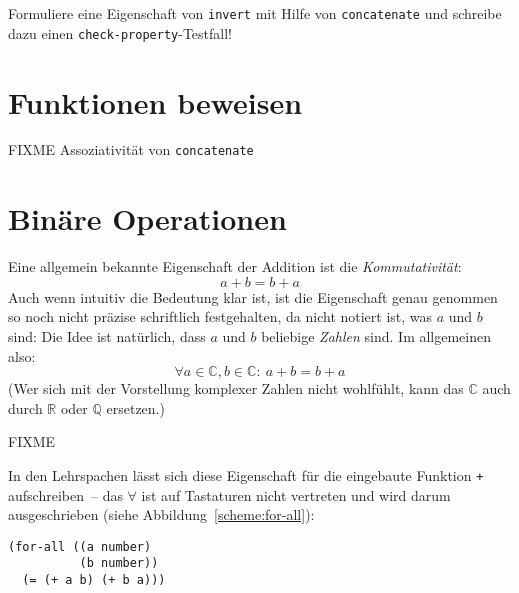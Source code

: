 \begin{aufgabeinline}
  Formuliere eine Eigenschaft von \lstinline{invert} mit Hilfe von
  \lstinline{concatenate} und schreibe dazu einen
  \lstinline{check-property}-Testfall!
\end{aufgabeinline}

\section{Funktionen beweisen}

FIXME Assoziativität von \lstinline{concatenate}

\section{Binäre Operationen}
\label{sec:eigenschaften-binaere-operationen}

Eine allgemein bekannte Eigenschaft der Addition ist die
\textit{Kommutativität}:
%
\begin{displaymath}
a + b = b + a
\end{displaymath}
%
Auch wenn intuitiv die Bedeutung klar ist, ist  die Eigenschaft genau
genommen so noch nicht präzise schriftlich festgehalten, da nicht
notiert ist, was $a$ und $b$ sind: Die Idee ist natürlich,
dass $a$ und $b$ beliebige \emph{Zahlen} sind.  Im allgemeinen also:
%
\begin{displaymath}
\forall a \in \mathbb{C}, b \in \mathbb{C}:\ a + b = b + a 
\end{displaymath}
%
(Wer sich mit der Vorstellung komplexer Zahlen nicht wohlfühlt, kann
das $\mathbb{C}$ auch durch $\mathbb{R}$ oder $\mathbb{Q}$ ersetzen.)

FIXME

In den Lehrspachen lässt sich diese Eigenschaft für die eingebaute Funktion
\lstinline{+} aufschreiben~-- das $\forall$ ist auf
Tastaturen nicht vertreten und wird darum ausgeschrieben (siehe
Abbildung~\ref{scheme:for-all}):
%
\begin{lstlisting}
(for-all ((a number)
          (b number))
  (= (+ a b) (+ b a)))
\end{lstlisting}
%

